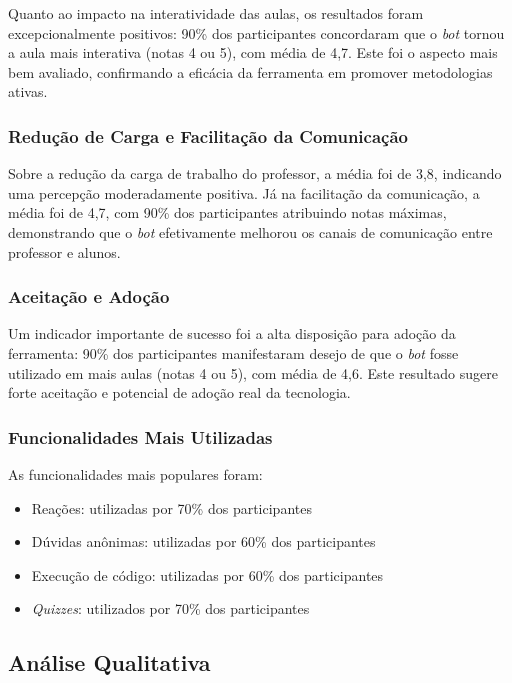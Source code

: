 Quanto ao impacto na interatividade das aulas, os resultados foram
excepcionalmente positivos: 90\% dos participantes concordaram que o \textit{bot}
tornou a aula mais interativa (notas 4 ou 5), com média de 4,7. Este foi o
aspecto mais bem avaliado, confirmando a eficácia da ferramenta em promover
metodologias ativas.

\subsubsection{Redução de Carga e Facilitação da Comunicação}

Sobre a redução da carga de trabalho do professor, a média foi de 3,8, indicando
uma percepção moderadamente positiva. Já na facilitação da comunicação, a média
foi de 4,7, com 90\% dos participantes atribuindo notas máximas, demonstrando
que o \textit{bot} efetivamente melhorou os canais de comunicação entre
professor e alunos.

\subsubsection{Aceitação e Adoção}

Um indicador importante de sucesso foi a alta disposição para adoção da
ferramenta: 90\% dos participantes manifestaram desejo de que o \textit{bot}
fosse utilizado em mais aulas (notas 4 ou 5), com média de 4,6. Este resultado
sugere forte aceitação e potencial de adoção real da tecnologia.

\subsubsection{Funcionalidades Mais Utilizadas}

As funcionalidades mais populares foram:
\begin{itemize}
\item Reações: utilizadas por 70\% dos participantes
\item Dúvidas anônimas: utilizadas por 60\% dos participantes  
\item Execução de código: utilizadas por 60\% dos participantes
\item \textit{Quizzes}: utilizados por 70\% dos participantes
\end{itemize}

\subsection{Análise Qualitativa}
\label{subsec:analise-qual}

